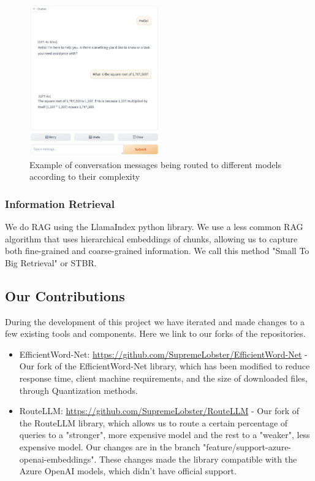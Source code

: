 \documentclass[a4paper,12pt,twoside]{ThesisStyle}
\begin{document}
\begin{figure}[htb]
  \centering
  \includegraphics[width=0.5\textwidth]{imatges/Routed conversation.png}
  \caption{Example of conversation messages being routed to different models according to their complexity}
\end{figure}

\subsubsection{Information Retrieval}

We do RAG using the LlamaIndex python library. We use a less common RAG algorithm that uses hierarchical embeddings of chunks, allowing us to capture both fine-grained and coarse-grained information. We call this method "Small To Big Retrieval" or STBR.

\subsection{Our Contributions}
During the development of this project we have iterated and made changes to a few existing tools and components. Here we link to our forks of the repositories.

\begin{itemize}
  \item EfficientWord-Net: \url{https://github.com/SupremeLobster/EfficientWord-Net} - Our fork of the EfficientWord-Net library, which has been modified to reduce response time, client machine requirements, and the size of downloaded files, through Quantization methods.
  \item RouteLLM: \url{https://github.com/SupremeLobster/RouteLLM} - Our fork of the RouteLLM library, which allows us to route a certain percentage of queries to a "stronger", more expensive model and the rest to a "weaker", less expensive model. Our changes are in the branch "feature/support-azure-openai-embeddings". These changes made the library compatible with the Azure OpenAI models, which didn't have official support.
\end{itemize}
\end{document}

